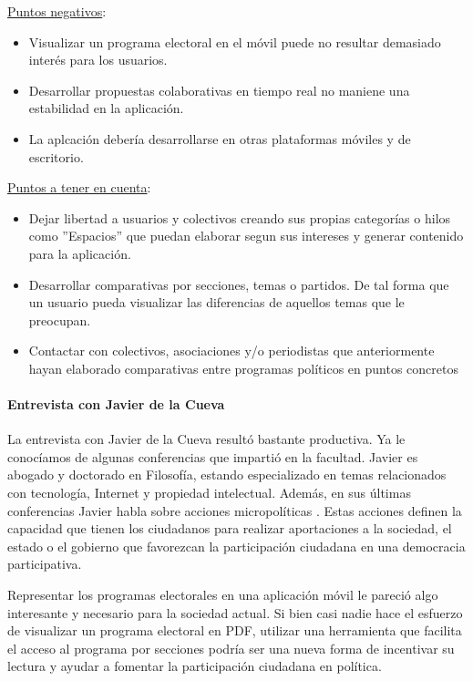 \underline{Puntos negativos}:

\begin{itemize}
 \item Visualizar un programa electoral en el móvil puede no resultar demasiado interés para los usuarios.
 \item Desarrollar propuestas colaborativas en tiempo real no maniene una estabilidad en la aplicación.
 \item La aplcación debería desarrollarse en otras plataformas móviles y de escritorio.
\end{itemize}

\underline{Puntos a tener en cuenta}:

\begin{itemize}
 \item Dejar libertad a usuarios y colectivos creando sus propias categorías o hilos como ''Espacios'' que puedan elaborar segun sus intereses y generar contenido para la aplicación.
 \item Desarrollar comparativas por secciones, temas o partidos. De tal forma que un usuario pueda visualizar las diferencias de aquellos temas que le preocupan.
 \item Contactar con colectivos, asociaciones y/o periodistas que anteriormente hayan elaborado comparativas entre programas políticos en puntos concretos
\end{itemize}

\paragraph{Entrevista con Javier de la Cueva}

La entrevista con Javier de la Cueva resultó bastante productiva. Ya le conocíamos de algunas conferencias que impartió en la facultad. Javier es abogado y doctorado en Filosofía, estando especializado en temas relacionados con tecnología, Internet y propiedad intelectual. Además, en sus últimas conferencias Javier habla sobre acciones micropolíticas \cite{ref:manualCiberactivista}. Estas acciones definen la capacidad que tienen los ciudadanos para realizar aportaciones a la sociedad, el estado o el gobierno que favorezcan la participación ciudadana en una democracia participativa.

Representar los programas electorales en una aplicación móvil le pareció algo interesante y necesario para la sociedad actual. Si bien casi nadie hace el esfuerzo de visualizar un programa electoral en PDF, utilizar una herramienta que facilita el acceso al programa por secciones podría ser una nueva forma de incentivar su lectura y ayudar a fomentar la participación ciudadana en política. 

